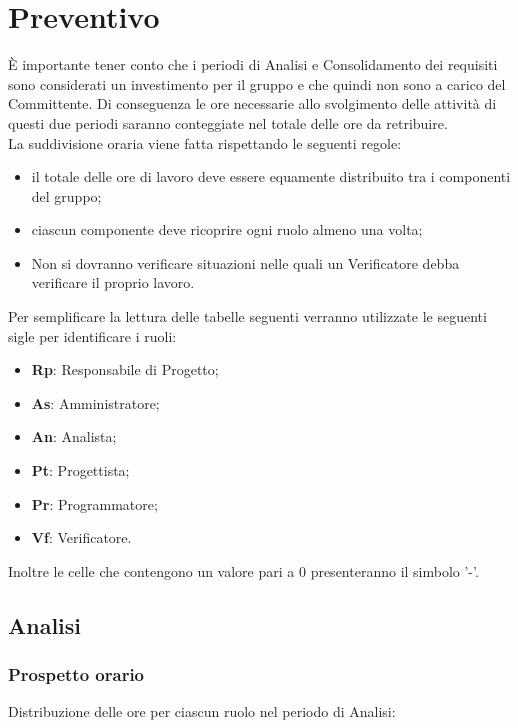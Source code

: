 \section{Preventivo}
È importante tener conto che i periodi di Analisi e Consolidamento dei requisiti sono considerati un investimento per il gruppo e che quindi non sono a carico del Committente.
Di conseguenza le ore necessarie allo svolgimento delle attività di questi due periodi saranno conteggiate nel totale delle ore da retribuire. \\

La suddivisione oraria viene fatta rispettando le seguenti regole:
\begin{itemize}
	\item il totale delle ore di lavoro deve essere equamente distribuito tra i componenti del gruppo;
	\item ciascun componente deve ricoprire ogni ruolo almeno una volta;
	\item Non si dovranno verificare situazioni nelle quali un Verificatore debba verificare il proprio lavoro.
\end{itemize}

Per semplificare la lettura delle tabelle seguenti verranno utilizzate le seguenti sigle per identificare i ruoli: 
\begin{itemize}
	\item \textbf{Rp}: Responsabile di Progetto;
	\item \textbf{As}: Amministratore;
	\item \textbf{An}: Analista;
	\item \textbf{Pt}: Progettista;
	\item \textbf{Pr}: Programmatore;
	\item \textbf{Vf}: Verificatore.
\end{itemize}
Inoltre le celle che contengono un valore pari a 0 presenteranno il simbolo '-'.

\newpage

\subsection{Analisi}
	\subsubsection{Prospetto orario}
		Distribuzione delle ore per ciascun ruolo nel periodo di Analisi:
		
